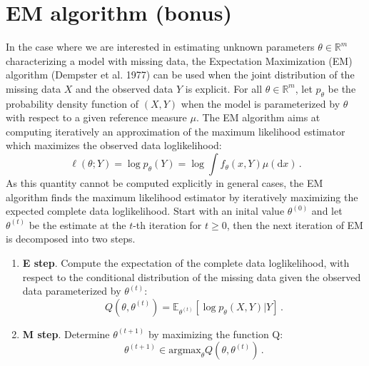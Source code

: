 \documentclass[a4paper,10pt,fleqn]{article}
\newcommand{\eqsp}{\,}
\newcommand{\1}{\ensuremath{\mathbbm{1}}}
\begin{document}
\section{EM algorithm (bonus)}
In the case where we are interested in estimating unknown parameters $\theta\in\mathbb{R}^m$ characterizing a model with missing data, the Expectation Maximization (EM) algorithm (Dempster et al. 1977) can be used when the joint distribution of the missing data $X$ and the observed data $Y$ is explicit. For all $\theta\in\mathbb{R}^m$, let $p_{\theta}$ be the probability density function of $(X,Y)$ when the model is parameterized by $\theta$ with respect to a given reference measure $\mu$. The EM algorithm aims at computing iteratively an approximation of the maximum likelihood estimator which maximizes the observed data loglikelihood:
$$
\ell(\theta;Y) = \log p_{\theta}(Y) =\log \int f_{\theta}(x,Y)\mu(\mathrm{d}x)\eqsp.
$$
As this quantity cannot be computed explicitly in general cases, the EM algorithm finds the maximum likelihood estimator by iteratively maximizing the expected complete data loglikelihood.
Start with an inital value $\theta^{(0)}$ and let $\theta^{(t)}$ be the estimate at the $t$-th iteration for $t\geqslant 0$, then the next iteration of EM is decomposed into two steps.
\begin{enumerate}
\item {\bf E step}. Compute the expectation of the complete data loglikelihood, with respect to the conditional distribution of the missing data given the observed data parameterized by $\theta^{(t)}$:
$$
Q(\theta,\theta^{(t)}) =\mathbb{E}_{\theta^{(t)}}\left[\log p_{\theta}(X,Y)|Y \right]\eqsp.%
$$
\item {\bf M step}. Determine $\theta^{(t+1)}$ by maximizing the function Q:
$$
\theta^{(t+1)}\in \mbox{argmax}_\theta Q(\theta,\theta^{(t)})\eqsp.
$$
\end{enumerate}
\end{document}
